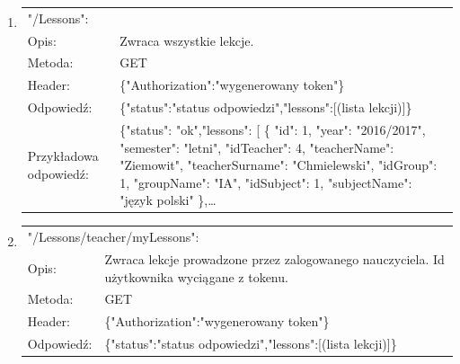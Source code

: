 \documentclass[12pt, titlepage]{article}
\begin{document}
\begin{enumerate}

	\item
	{\renewcommand{\arraystretch}{1.5}
	\begin{tabular}[t]{p{3cm} p{15cm}}
	\multicolumn{2}{l}{"/Lessons":} \\
	Opis: &  Zwraca wszystkie lekcje.\\
	Metoda: & GET \\
	Header: & \{"Authorization":"wygenerowany token"\} \\
	Odpowiedź: & \{"status":"status odpowiedzi",\newline "lessons":[(lista lekcji)]\} \\
	Przykładowa \newline odpowiedź: & 			\{"status": "ok",\newline "lessons": [\newline
        \{
            "id": 1,\newline
            "year": "2016/2017",\newline
            "semester": "letni",\newline
            "idTeacher": 4,\newline
            "teacherName": "Ziemowit",\newline
            "teacherSurname": "Chmielewski",\newline
            "idGroup": 1,\newline
            "groupName": "IA",\newline
            "idSubject": 1,\newline
            "subjectName": "język polski"
        \},\newline \ldots
	\end{tabular}}
	
	\item
	{\renewcommand{\arraystretch}{1.5}
	\begin{tabular}[t]{p{3cm} p{15cm}}
	\multicolumn{2}{l}{"/Lessons/teacher/myLessons":} \\
	Opis: &  Zwraca lekcje prowadzone przez zalogowanego nauczyciela. \newline Id użytkownika wyciągane z tokenu. \\
	Metoda: & GET \\
	Header: & \{"Authorization":"wygenerowany token"\} \\
	Odpowiedź: & \{"status":"status odpowiedzi",\newline "lessons":[(lista lekcji)]\}
	\end{tabular}}
	

\end{enumerate}
\end{document}
